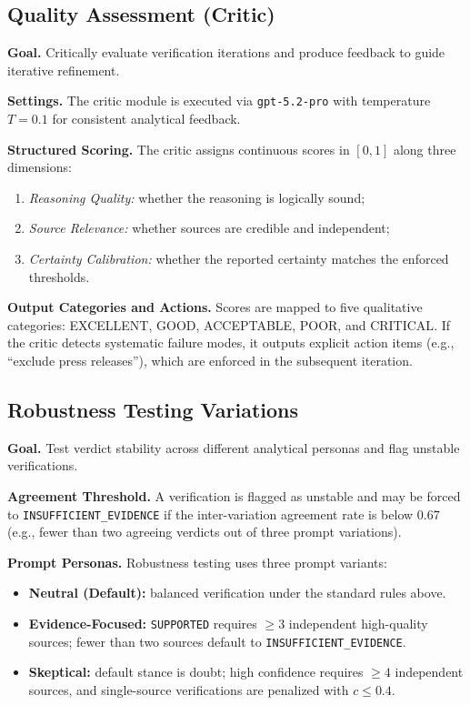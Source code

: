 \subsection{Quality Assessment (Critic)}
\label{app:critic}

\textbf{Goal.} Critically evaluate verification iterations and produce feedback to guide iterative refinement.

\textbf{Settings.} The critic module is executed via \texttt{gpt-5.2-pro} with temperature $T=0.1$ for consistent analytical feedback.

\textbf{Structured Scoring.} The critic assigns continuous scores in $[0,1]$ along three dimensions:
\begin{enumerate}
    \item \emph{Reasoning Quality:} whether the reasoning is logically sound;
    \item \emph{Source Relevance:} whether sources are credible and independent;
    \item \emph{Certainty Calibration:} whether the reported certainty matches the enforced thresholds.
\end{enumerate}

\textbf{Output Categories and Actions.} Scores are mapped to five qualitative categories:
\textsc{EXCELLENT}, \textsc{GOOD}, \textsc{ACCEPTABLE}, \textsc{POOR}, and \textsc{CRITICAL}.
If the critic detects systematic failure modes, it outputs explicit action items (e.g., ``exclude press releases''), which are enforced in the subsequent iteration.

\subsection{Robustness Testing Variations}
\label{app:robustness}

\textbf{Goal.} Test verdict stability across different analytical personas and flag unstable verifications.

\textbf{Agreement Threshold.} A verification is flagged as unstable and may be forced to \texttt{INSUFFICIENT\_EVIDENCE} if the inter-variation agreement rate is below $0.67$ (e.g., fewer than two agreeing verdicts out of three prompt variations).

\textbf{Prompt Personas.} Robustness testing uses three prompt variants:
\begin{itemize}
    \item \textbf{Neutral (Default):} balanced verification under the standard rules above.
    \item \textbf{Evidence-Focused:} \texttt{SUPPORTED} requires $\ge 3$ independent high-quality sources; fewer than two sources default to \texttt{INSUFFICIENT\_EVIDENCE}.
    \item \textbf{Skeptical:} default stance is doubt; high confidence requires $\ge 4$ independent sources, and single-source verifications are penalized with $c \le 0.4$.
\end{itemize}

